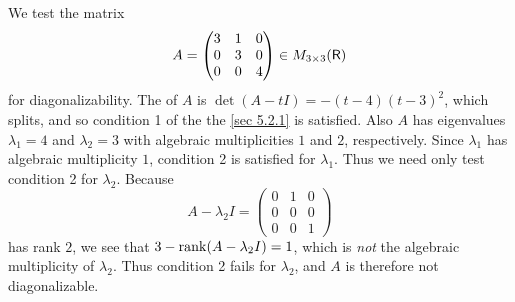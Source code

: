\begin{example} \label{example 5.2.5}
We test the matrix
\[
    A = \begin{pmatrix} 3 & 1 & 0 \\ 0 & 3 & 0 \\ 0 & 0 & 4 \end{pmatrix} \in M_{3 \times 3}(\textsf{R})
\]
for diagonalizability.
The \CPOLY{} of \(A\) is \(\det(A - t I) = -(t-4)(t-3)^2\), which splits, and so condition 1 of the the \ref{sec 5.2.1} is satisfied.
Also \(A\) has eigenvalues \(\lambda_1 = 4\) and \(\lambda_2 = 3\) with algebraic multiplicities \(1\) and \(2\), respectively.
Since \(\lambda_1\) has algebraic multiplicity \(1\), condition 2 is satisfied for \(\lambda_1\).
Thus we need only test condition 2 for \(\lambda_2\).
Because
\[
    A - \lambda_2 I = \begin{pmatrix} 0 & 1 & 0 \\ 0 & 0 & 0 \\ 0 & 0 & 1 \end{pmatrix}
\]
has rank \(2\), we see that \(3 - \mathrm{rank}(A - \lambda_2 I) = 1\), which is \emph{not} the algebraic multiplicity of \(\lambda_2\).
Thus condition 2 fails for \(\lambda_2\), and \(A\) is therefore not diagonalizable.
\end{example}

